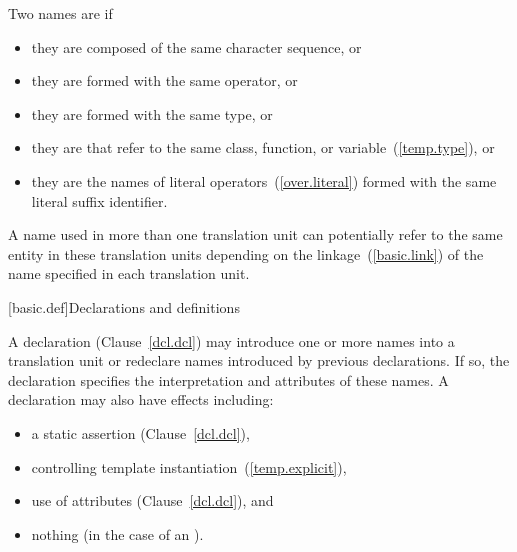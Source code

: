\pnum
Two names are  if

\begin{itemize}
\item they are  composed of the same character sequence, or
\item they are  formed with
the same operator, or
\item they are  formed
with the same type, or
\item they are  that refer to the same class,
function, or variable~(\ref{temp.type}), or
\item they are the names of literal operators~(\ref{over.literal}) formed with
the same literal suffix identifier.
\end{itemize}

\pnum
{}%
%
A name used in more than one translation unit can potentially
refer to the same entity in these translation units depending on the
linkage~(\ref{basic.link}) of the name specified in each
translation unit.

[basic.def]{Declarations and definitions}

\pnum
{}%
%
%
A declaration (Clause~\ref{dcl.dcl}) may introduce
one or more names into a translation
unit or redeclare names introduced by previous declarations.
If so, the
declaration specifies the interpretation and attributes of these names.
A declaration may also have effects including:

\begin{itemize}
\item a static assertion (Clause~\ref{dcl.dcl}),
\item controlling template instantiation~(\ref{temp.explicit}),
\item use of attributes (Clause~\ref{dcl.dcl}), and
\item nothing (in the case of an ).
\end{itemize}

